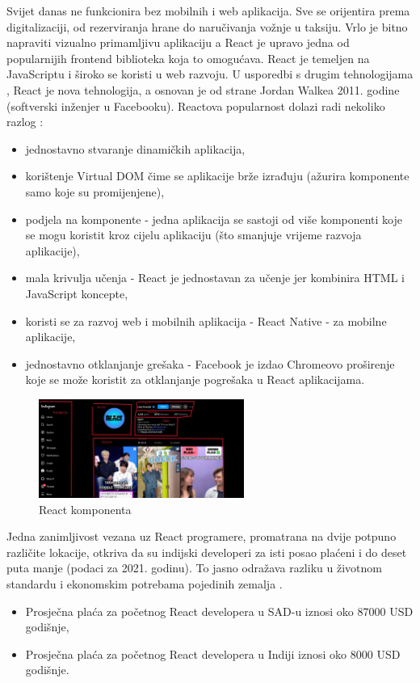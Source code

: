 \documentclass[]{foi}
\begin{document}
Svijet danas ne funkcionira bez mobilnih i web aplikacija. Sve se orijentira prema digitalizaciji, od rezerviranja hrane do naručivanja vožnje u taksiju. Vrlo je bitno napraviti vizualno
primamljivu aplikaciju a React je upravo jedna od popularnijih frontend biblioteka koja to omogućava. React je temeljen na JavaScriptu i široko se koristi u web razvoju. U usporedbi s drugim tehnologijama
, React je nova tehnologija, a osnovan je od strane Jordan Walkea 2011. godine (softverski inženjer u Facebooku). Reactova popularnost dolazi radi nekoliko razlog \cite{simplilearn2025react}:
\begin{itemize}
    \item jednostavno stvaranje dinamičkih aplikacija,
    \item korištenje Virtual DOM čime se aplikacije brže izrađuju (ažurira komponente samo koje su promijenjene),
    \item podjela na komponente - jedna aplikacija se sastoji od više komponenti koje se mogu koristit kroz cijelu aplikaciju (što smanjuje vrijeme razvoja aplikacije),
    \item mala krivulja učenja - React je jednostavan za učenje jer kombinira HTML i JavaScript koncepte,
    \item koristi se za razvoj web i mobilnih aplikacija - React Native - za mobilne aplikacije,
    \item jednostavno otklanjanje grešaka - Facebook je izdao Chromeovo proširenje koje se može koristit za otklanjanje pogrešaka u React aplikacijama.
\end{itemize}

\begin{figure}[ht!]
    \centering
    \includegraphics[width=0.6\textwidth]{./assets/components.png} 
    \caption{React komponenta}
    \label{fig:slika5}
\end{figure}


Jedna zanimljivost vezana uz React programere, promatrana na dvije potpuno različite lokacije, otkriva da su indijski developeri za isti posao plaćeni i do deset puta manje (podaci za 2021. godinu). 
To jasno odražava razliku u životnom standardu i ekonomskim potrebama pojedinih zemalja \cite{simplilearn2025react}.
\begin{itemize}
    \item Prosječna plaća za početnog React developera u SAD-u iznosi oko 87000 USD godišnje,
    \item Prosječna plaća za početnog React developera u Indiji iznosi oko 8000 USD godišnje.
\end{itemize}
\end{document}
